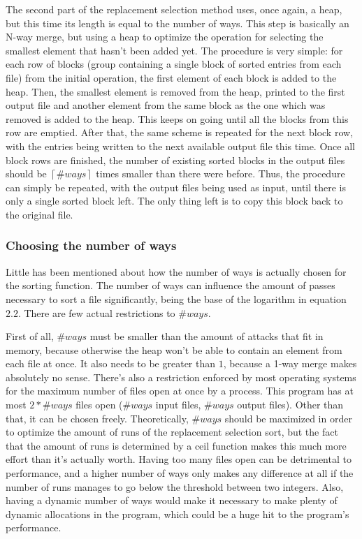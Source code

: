 \documentclass[10pt,a4paper]{article}
\numberwithin{equation}{section}
\begin{document}
The second part of the replacement selection method uses, once again, a heap, but this time its length is equal to the number of ways. This step is basically an N-way merge, but using a heap to optimize the operation for selecting the smallest element that hasn't been added yet. The procedure is very simple: for each row of blocks (group containing a single block of sorted entries from each file) from the initial operation, the first element of each block is added to the heap. Then, the smallest element is removed from the heap, printed to the first output file and another element from the same block as the one which was removed is added to the heap. This keeps on going until all the blocks from this row are emptied. After that, the same scheme is repeated for the next block row, with the entries being written to the next available output file this time. Once all block rows are finished, the number of existing sorted blocks in the output files should be $\left \lceil{\#ways}\right \rceil$ times smaller than there were before. Thus, the procedure can simply be repeated, with the output files being used as input, until there is only a single sorted block left. The only thing left is to copy this block back to the original file.

\subsubsection{Choosing the number of ways}

Little has been mentioned about how the number of ways is actually chosen for the sorting function. The number of ways can influence the amount of passes necessary to sort a file significantly, being the base of the logarithm in equation $2.2$. There are few actual restrictions to $\#ways$.

First of all, $\#ways$ must be smaller than the amount of attacks that fit in memory, because otherwise the heap won't be able to contain an element from each file at once. It also needs to be greater than $1$, because a 1-way merge makes absolutely no sense. There's also a restriction enforced by most operating systems for the maximum number of files open at once by a process. This program has at most $2 * \#ways$ files open ($\#ways$ input files, $\#ways$ output files). Other than that, it can be chosen freely. Theoretically, $\#ways$ should be maximized in order to optimize the amount of runs of the replacement selection sort, but the fact that the amount of runs is determined by a ceil function makes this much more effort than it's actually worth. Having too many files open can be detrimental to performance, and a higher number of ways only makes any difference at all if the number of runs manages to go below the threshold between two integers. Also, having a dynamic number of ways would make it necessary to make plenty of dynamic allocations in the program, which could be a huge hit to the program's performance.
\end{document}
